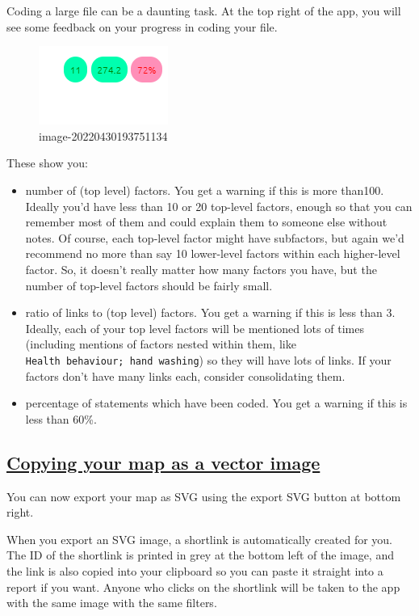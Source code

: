 \documentclass[
]{book}
\providecommand{\tightlist}{%
  \setlength{\itemsep}{0pt}\setlength{\parskip}{0pt}}
\begin{document}
Coding a large file can be a daunting task. At the top right of the app, you will see some feedback on your progress in coding your file.

\begin{figure}
\centering
\includegraphics{_assets/image-20220430193751134.png}
\caption{image-20220430193751134}
\end{figure}

These show you:

\begin{itemize}
\tightlist
\item
  number of (top level) factors. You get a warning if this is more than100. Ideally you'd have less than 10 or 20 top-level factors, enough so that you can remember most of them and could explain them to someone else without notes. Of course, each top-level factor might have subfactors, but again we'd recommend no more than say 10 lower-level factors within each higher-level factor. So, it doesn't really matter how many factors you have, but the number of top-level factors should be fairly small.
\item
  ratio of links to (top level) factors. You get a warning if this is less than 3. Ideally, each of your top level factors will be mentioned lots of times (including mentions of factors nested within them, like \texttt{Health\ behaviour;\ hand\ washing}) so they will have lots of links. If your factors don't have many links each, consider consolidating them.
\item
  percentage of statements which have been coded. You get a warning if this is less than 60\%.
\end{itemize}

\hypertarget{copying-your-map-as-a-vector-image}{%
\subsection{\texorpdfstring{\protect\hyperlink{copy-svg}{Copying your map as a vector image}}{Copying your map as a vector image}}\label{copying-your-map-as-a-vector-image}}

You can now export your map as SVG using the export SVG button at bottom right.

When you export an SVG image, a shortlink is automatically created for you. The ID of the shortlink is printed in grey at the bottom left of the image, and the link is also copied into your clipboard so you can paste it straight into a report if you want. Anyone who clicks on the shortlink will be taken to the app with the same image with the same filters.
\end{document}
